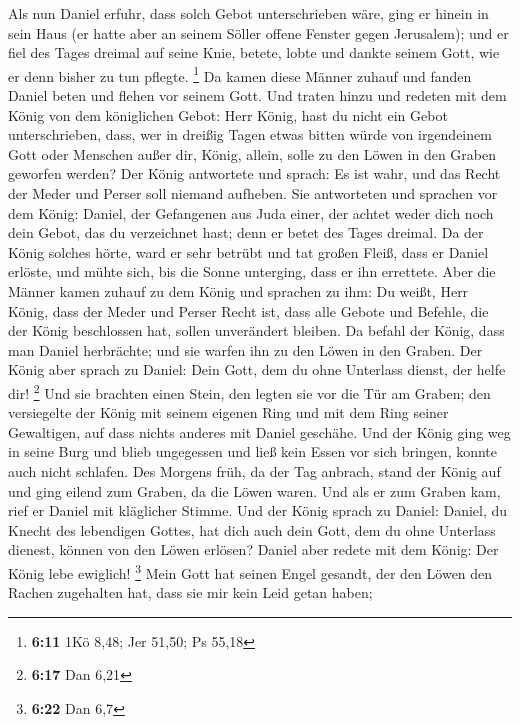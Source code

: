  Als nun Daniel erfuhr, dass solch Gebot unterschrieben
wäre, ging er hinein in sein Haus (er hatte aber an seinem Söller offene
Fenster gegen Jerusalem); und er fiel des Tages dreimal auf seine Knie,
betete, lobte und dankte seinem Gott, wie er denn bisher zu tun pflegte.
\footnote{\textbf{6:11} 1Kö 8,48; Jer 51,50; Ps 55,18}  Da
kamen diese Männer zuhauf und fanden Daniel beten und flehen vor seinem
Gott.  Und traten hinzu und redeten mit dem König von dem
königlichen Gebot: Herr König, hast du nicht ein Gebot unterschrieben,
dass, wer in dreißig Tagen etwas bitten würde von irgendeinem Gott oder
Menschen außer dir, König, allein, solle zu den Löwen in den Graben
geworfen werden? Der König antwortete und sprach: Es ist wahr, und das
Recht der Meder und Perser soll niemand aufheben.  Sie
antworteten und sprachen vor dem König: Daniel, der Gefangenen aus Juda
einer, der achtet weder dich noch dein Gebot, das du verzeichnet hast;
denn er betet des Tages dreimal.  Da der König solches
hörte, ward er sehr betrübt und tat großen Fleiß, dass er Daniel
erlöste, und mühte sich, bis die Sonne unterging, dass er ihn errettete.
 Aber die Männer kamen zuhauf zu dem König und sprachen zu
ihm: Du weißt, Herr König, dass der Meder und Perser Recht ist, dass
alle Gebote und Befehle, die der König beschlossen hat, sollen
unverändert bleiben.  Da befahl der König, dass man Daniel
herbrächte; und sie warfen ihn zu den Löwen in den Graben. Der König
aber sprach zu Daniel: Dein Gott, dem du ohne Unterlass dienst, der
helfe dir! \footnote{\textbf{6:17} Dan 6,21}  Und sie
brachten einen Stein, den legten sie vor die Tür am Graben; den
versiegelte der König mit seinem eigenen Ring und mit dem Ring seiner
Gewaltigen, auf dass nichts anderes mit Daniel geschähe. 
Und der König ging weg in seine Burg und blieb ungegessen und ließ kein
Essen vor sich bringen, konnte auch nicht schlafen.  Des
Morgens früh, da der Tag anbrach, stand der König auf und ging eilend
zum Graben, da die Löwen waren.  Und als er zum Graben kam,
rief er Daniel mit kläglicher Stimme. Und der König sprach zu Daniel:
Daniel, du Knecht des lebendigen Gottes, hat dich auch dein Gott, dem du
ohne Unterlass dienest, können von den Löwen erlösen? 
Daniel aber redete mit dem König: Der König lebe ewiglich! \footnote{\textbf{6:22}
  Dan 6,7}  Mein Gott hat seinen Engel gesandt, der den
Löwen den Rachen zugehalten hat, dass sie mir kein Leid getan haben;
